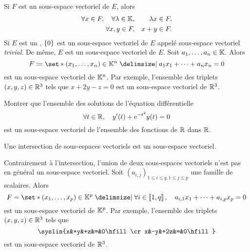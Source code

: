 \documentclass{magnolia}
\begin{document}
\begin{remarques}
\remarque Si $F$ est un sous-espace vectoriel de $E$, alors
  \begin{eqnarray*}
\forall x\in F,\quad \forall \lambda\in\mathbb{K},& & \lambda x\in F,\\
\forall x,y\in F,& & x+y \in F.
	\end{eqnarray*}
\remarque[utile=-3] Si $E$ est un \Kev, $\left\{0\right\}$ est un sous-espace vectoriel de $E$
  appelé sous-espace vectoriel \emph{trivial}. De même, $E$ est un sous-espace vectoriel de
	$E$.
\remarque[utile=-2] Soit $a_1,\ldots,a_n\in\mathbb{K}$. Alors
  \[F\defeq\enstq{(x_1,\ldots,x_n)\in\K^n}{a_1 x_1+\cdots+a_n x_n=0}\]
  est un sous-espace vectoriel de $\mathbb{K}^n$. Par exemple, l'ensemble des triplets $(x,y,z)\in\mathbb{R}^3$ tels que
  $x+2y-z=0$ est un sous-espace vectoriel de $\mathbb{R}^3$.
\end{remarques}

\begin{exoUnique}
\exo Montrer que l'ensemble des solutions de l'équation différentielle
  \[\forall t\in\mathbb{R},\quad y'(t)+{\rm e}^{-t^2}y(t)=0\]
  est un sous-espace vectoriel de l'ensemble des fonctions de $\mathbb{R}$ dans $\mathbb{R}$.
\end{exoUnique}



\begin{proposition}[utile=-3]
Une intersection de sous-espaces vectoriels est un sous-espace vectoriel.
\end{proposition}

\begin{remarques}
\remarque[utile=-1] Contrairement à l'intersection, l'union de deux sous-espaces
  vectoriels n'est pas en général un sous-espace vectoriel.
\remarque[utile=-2] Soit $(a_{i,j})_{1\leq i\leq q, 1\leq j\leq p}$ une famille de
  scalaires. Alors
  \[F=\enstq{(x_1,\ldots,x_p)\in\K^p}%
    {\forall i\in\intere{1}{q} \qsep
     a_{i,1} x_1+\cdots+a_{i,p} x_p=0}\]
  est un sous-espace vectoriel de $\mathbb{K}^p$. Par exemple, l'ensemble des triplets $(x,y,z)\in\mathbb{R}^3$ tels que
  \[\syslin{x&+y&+z&=&0\hfill\cr
            x&-y&+2z&=&0\hfill}\]
  est un sous-espace vectoriel de $\mathbb{R}^3$.
\end{remarques}
\end{document}
